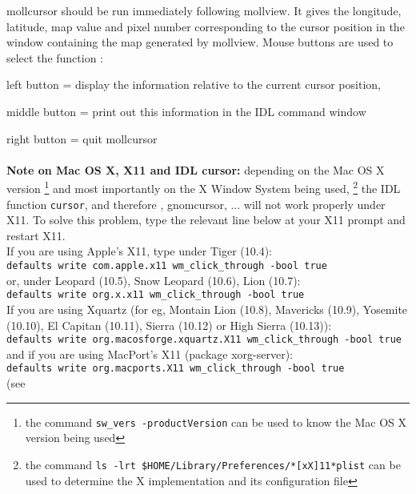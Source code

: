 \begin{codedescription}
{mollcursor should be run immediately following mollview. It gives the
longitude, latitude, map value and pixel number
corresponding to the cursor position in the window containing the map generated
by mollview. Mouse buttons are used to select the function :  

left button = display the information relative to the current cursor position, 

middle button = print out this information in the IDL command window 

right button = quit mollcursor\\
\\
{\bf{Note on Mac OS X, X11 and IDL cursor:}} 
depending on the Mac OS X version%
\footnote{the command {\tt sw\_vers -productVersion}
 can be used to know the Mac OS X version being used}
and most importantly on the X Window System being used,%
\footnote{the command
{\tt ls -lrt  \$HOME/Library/Preferences/*[xX]11*plist}
can be used to determine the X implementation and its configuration file}
the IDL function {\tt cursor}, and therefore \healpix \thedocid,
gnomcursor, $\ldots$ will not
work properly under X11. To solve this problem, type the relevant line below at your X11 prompt and restart X11.\\
If you are using Apple's X11, type under Tiger (10.4): \\
{\footnotesize {\tt defaults write com.apple.x11 wm\_click\_through -bool true}} \\
or, under Leopard (10.5), Snow Leopard (10.6), Lion (10.7): \\
{\footnotesize {\tt defaults write org.x.x11 wm\_click\_through -bool true}} \\
If you are using Xquartz (for eg, Montain Lion (10.8), Mavericks (10.9), Yosemite (10.10), El Capitan (10.11), Sierra (10.12) or High Sierra (10.13)): \\
{\footnotesize {\tt defaults write org.macosforge.xquartz.X11 wm\_click\_through -bool true}}\\
and if you are using MacPort's X11 (package xorg-server):\\
{\footnotesize {\tt defaults write org.macports.X11 wm\_click\_through -bool true}}\\
(see
}
\end{codedescription}
